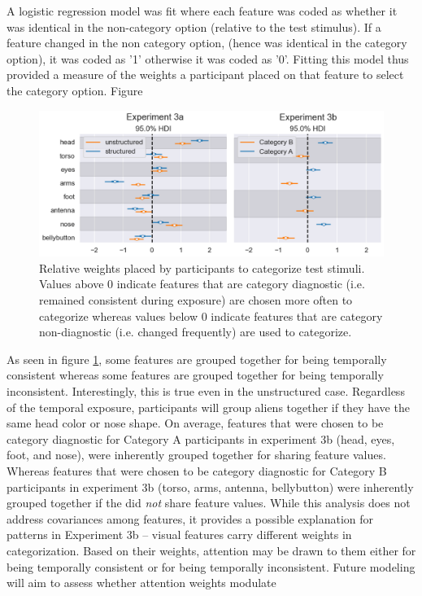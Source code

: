 A logistic regression model was fit where each feature was coded as whether it was identical in the non-category option (relative to the test stimulus). If a feature changed in the non category option, (hence was identical in the category option), it was coded as '1' otherwise it was coded as '0'. Fitting this model thus provided a measure of the weights a participant placed on that feature to select the category option. Figure 

\begin{figure}[H]
    \centering
    \includegraphics[width = \textwidth]{chapter_notebooks/chapter_4/figures/feat_importances.png}
    \caption{Relative weights placed by participants to categorize test stimuli. Values above 0 indicate features that are category diagnostic (i.e. remained consistent during exposure) are chosen more often to categorize whereas values below 0 indicate features that are category non-diagnostic (i.e. changed frequently) are used to categorize.}
    \label{fig:feat-importances}
\end{figure}

As seen in figure \ref{fig:feat-importances}, some features are grouped together for being temporally consistent whereas some features are grouped together for being temporally inconsistent. Interestingly, this is true even in the unstructured case. Regardless of the temporal exposure, participants will group aliens together if they have the same head color or nose shape. On average, features that were chosen to be category diagnostic for Category A participants in experiment 3b (head, eyes, foot, and nose), were inherently grouped together for sharing feature values. Whereas features that were chosen to be category diagnostic for Category B participants in experiment 3b (torso, arms, antenna, bellybutton) were inherently grouped together if the did \textit{not} share feature values. While this analysis does not address covariances among features, it provides a possible explanation for patterns in Experiment 3b -- visual features carry different weights in categorization. Based on their weights, attention may be drawn to them either for being temporally consistent or for being temporally inconsistent. Future modeling will aim to assess whether attention weights modulate 